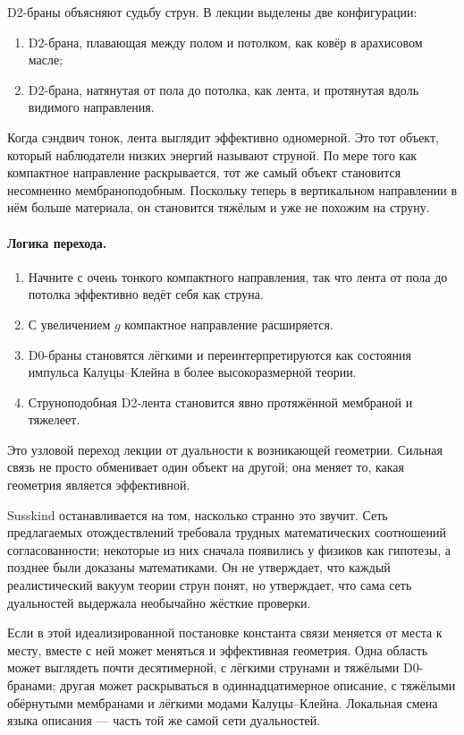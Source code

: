 D2-браны объясняют судьбу струн. В лекции выделены две конфигурации:
\begin{enumerate}
\item D2-брана, плавающая между полом и потолком, как ковёр в арахисовом масле;
\item D2-брана, натянутая от пола до потолка, как лента, и протянутая вдоль видимого направления.
\end{enumerate}
Когда сэндвич тонок, лента выглядит эффективно одномерной. Это тот объект, который наблюдатели низких энергий называют струной. По мере того как компактное направление раскрывается, тот же самый объект становится несомненно мембраноподобным. Поскольку теперь в вертикальном направлении в нём больше материала, он становится тяжёлым и уже не похожим на струну.

\paragraph{Логика перехода.}
\begin{enumerate}
\item Начните с очень тонкого компактного направления, так что лента от пола до потолка эффективно ведёт себя как струна.
\item С увеличением \(g\) компактное направление расширяется.
\item D0-браны становятся лёгкими и переинтерпретируются как состояния импульса Калуцы--Клейна в более высокоразмерной теории.
\item Струноподобная D2-лента становится явно протяжённой мембраной и тяжелеет.
\end{enumerate}
Это узловой переход лекции от дуальности к возникающей геометрии. Сильная связь не просто обменивает один объект на другой; она меняет то, какая геометрия является эффективной.

Susskind останавливается на том, насколько странно это звучит. Сеть предлагаемых отождествлений требовала трудных математических соотношений согласованности; некоторые из них сначала появились у физиков как гипотезы, а позднее были доказаны математиками. Он не утверждает, что каждый реалистический вакуум теории струн понят, но утверждает, что сама сеть дуальностей выдержала необычайно жёсткие проверки.

Если в этой идеализированной постановке константа связи меняется от места к месту, вместе с ней может меняться и эффективная геометрия. Одна область может выглядеть почти десятимерной, с лёгкими струнами и тяжёлыми D0-бранами; другая может раскрываться в одиннадцатимерное описание, с тяжёлыми обёрнутыми мембранами и лёгкими модами Калуцы--Клейна. Локальная смена языка описания — часть той же самой сети дуальностей.

